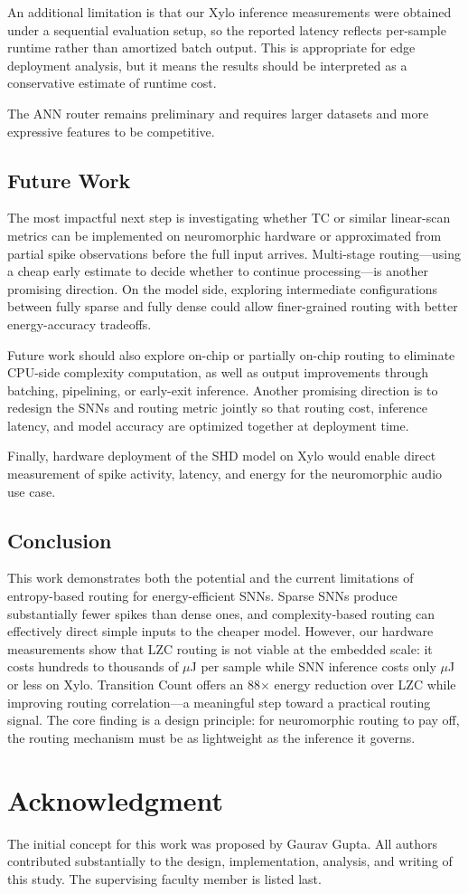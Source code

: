 \documentclass[conference]{IEEEtran}
\begin{document}
An additional limitation is that our Xylo inference measurements were obtained under a sequential evaluation setup, so the reported latency reflects per-sample runtime rather than amortized batch output. This is appropriate for edge deployment analysis, but it means the results should be interpreted as a conservative estimate of runtime cost.

The ANN router remains preliminary and requires larger datasets and more expressive features to be competitive.

\subsection{Future Work}
The most impactful next step is investigating whether TC or similar linear-scan metrics can be implemented on neuromorphic hardware or approximated from partial spike observations before the full input arrives. Multi-stage routing—using a cheap early estimate to decide whether to continue processing—is another promising direction. On the model side, exploring intermediate configurations between fully sparse and fully dense could allow finer-grained routing with better energy-accuracy tradeoffs. 

Future work should also explore on-chip or partially on-chip routing to eliminate CPU-side complexity computation, as well as output improvements through batching, pipelining, or early-exit inference. Another promising direction is to redesign the SNNs and routing metric jointly so that routing cost, inference latency, and model accuracy are optimized together at deployment time.

Finally, hardware deployment of the SHD model on Xylo would enable direct measurement of spike activity, latency, and energy for the neuromorphic audio use case.

\subsection{Conclusion}

This work demonstrates both the potential and the current limitations of entropy-based routing for energy-efficient SNNs. Sparse SNNs produce substantially fewer spikes than dense ones, and complexity-based routing can effectively direct simple inputs to the cheaper model. However, our hardware measurements show that LZC routing is not viable at the embedded scale: it costs hundreds to thousands of $\mu$J per sample while SNN inference costs only $\mu$J or less on Xylo. Transition Count offers an 88$\times$ energy reduction over LZC while improving routing correlation—a meaningful step toward a practical routing signal. The core finding is a design principle: for neuromorphic routing to pay off, the routing mechanism must be as lightweight as the inference it governs.

\section*{Acknowledgment}
The initial concept for this work was proposed by Gaurav Gupta. All authors contributed substantially to the design, implementation, analysis, and writing of this study. The supervising faculty member is listed last.

\printbibliography
\end{document}
